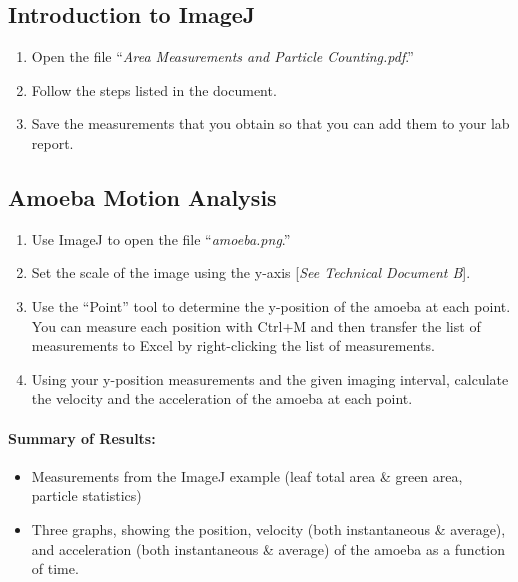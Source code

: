 \subsection{Introduction to ImageJ}
\begin{enumerate}
\item Open the file ``\textit{Area Measurements and Particle Counting.pdf}.''
\item Follow the steps listed in the document.
\item Save the measurements that you obtain so that you can add them to your lab report.
\end{enumerate}

\subsection{Amoeba Motion Analysis}
\begin{enumerate}
\item Use ImageJ to open the file ``\textit{amoeba.png}.''
\item Set the scale of the image using the y-axis [\textit{See Technical Document B}].
\item Use the ``Point'' tool to determine the y-position of the amoeba at each point.
You can measure each position with Ctrl+M and then transfer the list of measurements to Excel by right-clicking the list of measurements.
\item Using your y-position measurements and the given imaging interval, calculate the velocity and the acceleration of the amoeba at each point. 
\end{enumerate}

\paragraph{ Summary of Results:}
\begin{itemize}
\item Measurements from the ImageJ example (leaf total area \& green area, particle statistics)
\item Three graphs, showing the position, velocity (both instantaneous \& average), and acceleration (both instantaneous \& average) of the amoeba as a function of time.
\end{itemize}

